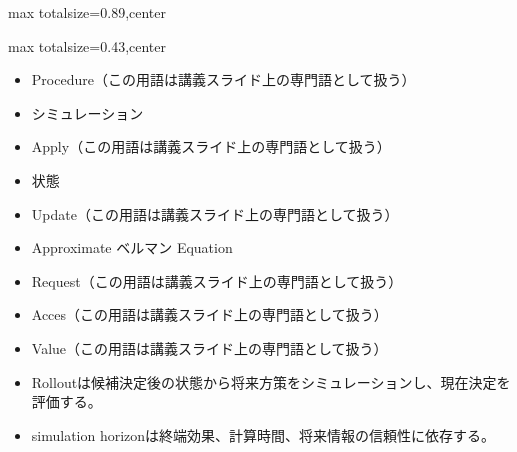 \begin{minipage}[t]{0.58\textwidth}
\begin{adjustbox}{max totalsize={\textwidth}{0.89\textheight},center}
\begin{minipage}{\textwidth}
\end{minipage}
\end{adjustbox}
\end{minipage}


\clearpage
{}
\begin{minipage}[t]{0.405\textwidth}
\begin{adjustbox}{max totalsize={\textwidth}{0.43\textheight},center}
\begin{minipage}{\textwidth}\scriptsize
{}\begin{itemize}
\item Procedure（この用語は講義スライド上の専門語として扱う）
\item シミュレーション
\item Apply（この用語は講義スライド上の専門語として扱う）
\item 状態
\item Update（この用語は講義スライド上の専門語として扱う）
\item Approximate ベルマン Equation
\item Request（この用語は講義スライド上の専門語として扱う）
\item Acces（この用語は講義スライド上の専門語として扱う）
\item Value（この用語は講義スライド上の専門語として扱う）
\end{itemize}\begin{itemize}
\item Rolloutは候補決定後の状態から将来方策をシミュレーションし、現在決定を評価する。
\item simulation horizonは終端効果、計算時間、将来情報の信頼性に依存する。
\end{itemize}
\end{minipage}
\end{adjustbox}
\end{minipage}\hfill

